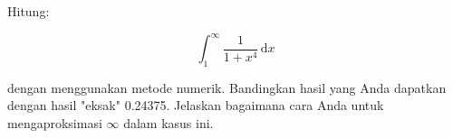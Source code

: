 \documentclass[12pt]{article}
\begin{document}
\thispagestyle{empty}

Hitung:

$$\int_{1}^{\infty} \frac{1}{1 + x^4} \,\mathrm{d}x$$

dengan menggunakan metode numerik. Bandingkan hasil yang Anda dapatkan
dengan hasil "eksak" 0.24375. Jelaskan bagaimana cara Anda untuk mengaproksimasi
$\infty$ dalam kasus ini.
\end{document}

